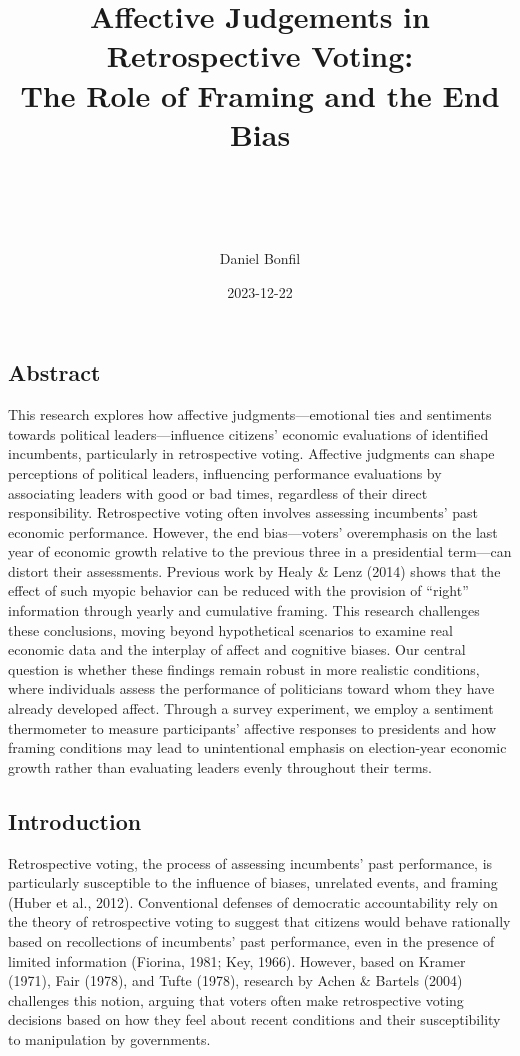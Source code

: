 \documentclass[
]{article}
\title{\hfill\break
\hfill\break
Affective Judgements in Retrospective Voting:\\
The Role of Framing and the End Bias\\
\strut \\}
\subtitle{\hfill\break
\hfill\break
FGV EBAPE\\
\strut \\
\strut \\
First Qualifying Examination\\
(Conceptual Paper)\\
\strut \\}
\author{Daniel Bonfil}
\date{2023-12-22}
\begin{document}
\maketitle

{
\setcounter{tocdepth}{2}
\tableofcontents
}
\newpage
\doublespacing

\hypertarget{abstract}{%
\subsection{Abstract}\label{abstract}}

This research explores how affective judgments---emotional ties and
sentiments towards political leaders---influence citizens' economic
evaluations of identified incumbents, particularly in retrospective
voting. Affective judgments can shape perceptions of political leaders,
influencing performance evaluations by associating leaders with good or
bad times, regardless of their direct responsibility. Retrospective
voting often involves assessing incumbents' past economic performance.
However, the end bias---voters' overemphasis on the last year of
economic growth relative to the previous three in a presidential
term---can distort their assessments. Previous work by Healy \& Lenz
(2014) shows that the effect of such myopic behavior can be reduced with
the provision of ``right'' information through yearly and cumulative
framing. This research challenges these conclusions, moving beyond
hypothetical scenarios to examine real economic data and the interplay
of affect and cognitive biases. Our central question is whether these
findings remain robust in more realistic conditions, where individuals
assess the performance of politicians toward whom they have already
developed affect. Through a survey experiment, we employ a sentiment
thermometer to measure participants' affective responses to presidents
and how framing conditions may lead to unintentional emphasis on
election-year economic growth rather than evaluating leaders evenly
throughout their terms.

\hypertarget{introduction}{%
\subsection{Introduction}\label{introduction}}

Retrospective voting, the process of assessing incumbents' past
performance, is particularly susceptible to the influence of biases,
unrelated events, and framing (Huber et al., 2012). Conventional
defenses of democratic accountability rely on the theory of
retrospective voting to suggest that citizens would behave rationally
based on recollections of incumbents' past performance, even in the
presence of limited information (Fiorina, 1981; Key, 1966). However,
based on Kramer (1971), Fair (1978), and Tufte (1978), research by Achen
\& Bartels (2004) challenges this notion, arguing that voters often make
retrospective voting decisions based on how they feel about recent
conditions and their susceptibility to manipulation by governments.
\end{document}
